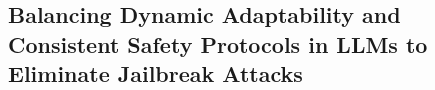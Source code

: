 


\subsection{Balancing Dynamic Adaptability and Consistent Safety Protocols in LLMs to Eliminate Jailbreak Attacks}

